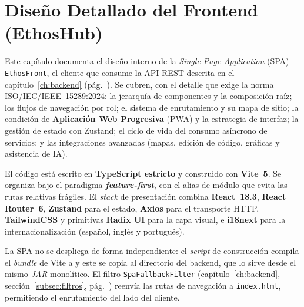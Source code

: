 \chapter{Diseño Detallado del Frontend (EthosHub)}
\label{ch:frontend}

Este capítulo documenta el diseño interno de la \textit{Single Page Application} (SPA)
\texttt{EthosFront}, el cliente que consume la API REST descrita en el
capítulo~\ref{ch:backend} (pág.~\pageref{ch:backend}). Se cubren, con el detalle que exige
la norma ISO/IEC/IEEE~15289:2024: la jerarquía de componentes y la composición raíz; los
flujos de navegación por rol; el sistema de enrutamiento y su mapa de sitio; la condición
de \textbf{Aplicación Web Progresiva} (PWA) y la estrategia de interfaz; la gestión de
estado con Zustand; el ciclo de vida del consumo asíncrono de servicios; y las
integraciones avanzadas (mapas, edición de código, gráficas y asistencia de IA).

El código está escrito en \textbf{TypeScript estricto} y construido con \textbf{Vite~5}.
Se organiza bajo el paradigma \textbf{\textit{feature-first}}, con el alias de módulo
 que evita las rutas relativas frágiles. El \textit{stack}
de presentación combina \textbf{React~18.3}, \textbf{React Router~6}, \textbf{Zustand}
para el estado, \textbf{Axios} para el transporte HTTP, \textbf{TailwindCSS} y primitivas
\textbf{Radix UI} para la capa visual, e \textbf{i18next} para la internacionalización
(español, inglés y portugués).

\begin{NotaTecnica}
La SPA no se despliega de forma independiente: el \textit{script} de construcción compila
el \textit{bundle} de Vite a  y este se copia al directorio
 del backend, que lo sirve desde el mismo \textit{JAR} monolítico. El
filtro \texttt{SpaFallbackFilter} (capítulo~\ref{ch:backend}, sección~\ref{subsec:filtros},
pág.~\pageref{subsec:filtros}) reenvía las rutas de navegación a \texttt{index.html},
permitiendo el enrutamiento del lado del cliente.
\end{NotaTecnica}

